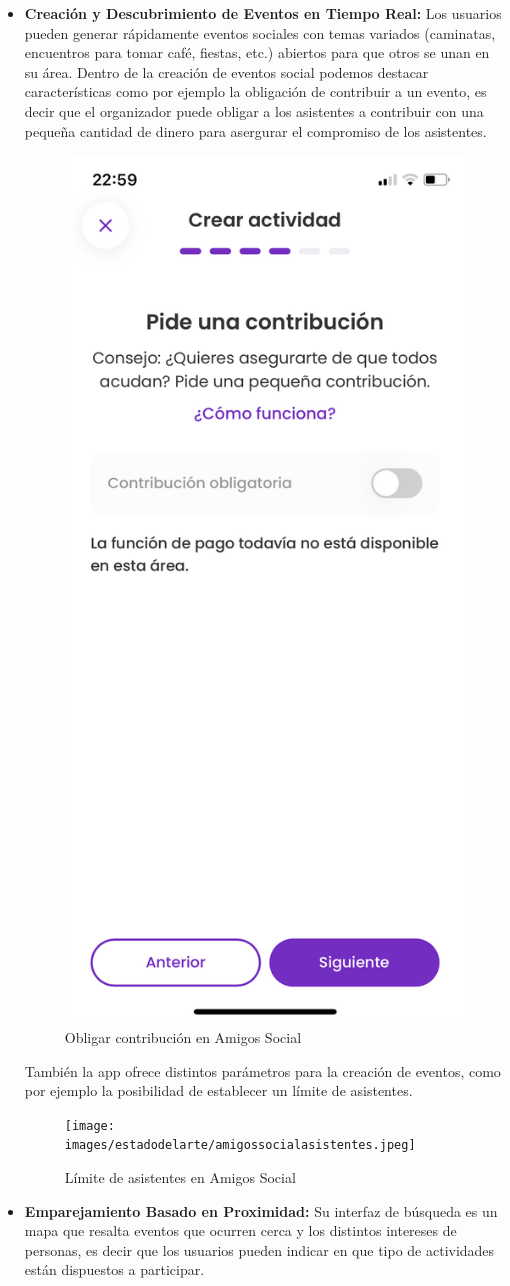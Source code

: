 \begin{itemize}
\item \textbf{Creación y Descubrimiento de Eventos en Tiempo Real:} Los usuarios pueden generar rápidamente eventos sociales con temas variados (caminatas, encuentros para tomar café, fiestas, etc.) abiertos para que otros se unan en su área.
Dentro de la creación de eventos social podemos destacar características como por ejemplo la obligación de contribuir a un evento, es decir que el organizador 
puede obligar a los asistentes a contribuir con una pequeña cantidad de dinero para asergurar el compromiso de los asistentes.
\begin{figure}[H]
  \centering
  \includegraphics[cframe=black 2pt,width=0.3\linewidth]{images/estadodelarte/amigossocialcontribucion.jpeg}
  \caption{Obligar contribución en Amigos Social}
  \label{fig:amigosocial_contribucion}
\end{figure}
También la app ofrece distintos parámetros para la creación de eventos, como por ejemplo la posibilidad de establecer un límite de asistentes.
\begin{figure}[H]
  \centering
  \texttt{[image: images/estadodelarte/amigossocialasistentes.jpeg]}
  \caption{Límite de asistentes en Amigos Social}
  \label{fig:amigosocial_asistentes}
\end{figure}
\item \textbf{Emparejamiento Basado en Proximidad:} Su interfaz de búsqueda es un mapa que resalta eventos que ocurren cerca y los distintos intereses de personas, es decir que los usuarios pueden 
indicar en que tipo de actividades están dispuestos a participar.
\begin{figure}[H]
  \centering

\end{figure}
\end{itemize}
